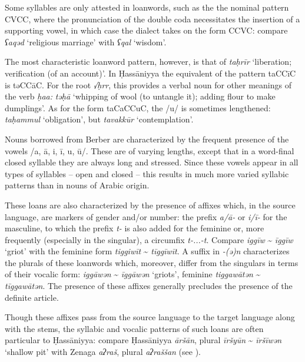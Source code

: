 \documentclass[output=paper]{langsci/langscibook}
\begin{document}
Some syllables are only attested in loanwords, such as the the nominal pattern CVCC, where the pronunciation of the double coda necessitates the insertion of a supporting vowel, in which case the dialect takes on the form CCVC: compare \textit{ʕaqəd} ‘religious marriage’ with \textit{ʕqal} ‘wisdom’.

The most characteristic loanword pattern, however, is that of \textit{taḥrīr} ‘liberation; verification (of an account)’. In Ḥassāniyya the equivalent of the pattern taCCīC is təCCāC. For the root \textit{√ḥrr}, this provides a verbal noun for other meanings of the verb \textit{ḥa{\R}{\R}a{\R}:} \textit{təḥ{\R}ā{\R}} ‘whipping of wool (to untangle it); adding flour to make dumplings’. As for the form taCaCCuC, the /u/ is sometimes lengthened: \textit{taḥammul} ‘obligation’, but \textit{tavakkūr} ‘contemplation’.


Nouns borrowed from Berber are characterized by the frequent presence of the vowels /a, ā, i, ī, u, ū/. These are of varying lengths, except that in a word-final closed syllable they are always long and stressed. Since these vowels appear in all types of syllables – open and closed – this results in much more varied syllabic patterns than in nouns of Arabic origin. 

These loans are also characterized by the presence of affixes which, in the source language, are markers of gender and/or number: the prefix \textit{a/ā-} or \textit{i/ī-} for the masculine, to which the prefix \textit{t-} is also added for the feminine or, more frequently (especially in the singular), a circumfix \textit{t-...-t}. Compare \textit{iggīw} \~{} \textit{īggīw} ‘griot’ with the feminine form \textit{tiggiwīt} \~{} \textit{tīggīwīt}. A suffix in \textit{-(ə)n} characterizes the plurals of these loanwords which, moreover, differ from the singulars in terms of their vocalic form: \textit{iggāwən} \~{} \textit{īggāwən} ‘griots’, feminine \textit{tiggawātən} \~{} \textit{tīggawātən}. The presence of these affixes generally precludes the presence of the definite article.

Though these affixes pass from the source language to the target language along with the stems, the syllabic and vocalic patterns of such loans are often particular to Ḥassāniyya: compare Ḥassāniyya \textit{āršān}, plural \textit{īršyūn} \~{} \textit{īršīwən} ‘shallow pit’ with Zenaga \textit{aʔraš}, plural \textit{aʔraššan} (see \citealt{Taine-Cheikh1997Zenaga}).
\end{document}
